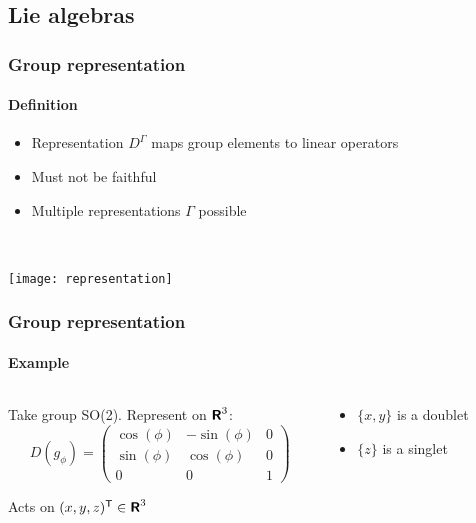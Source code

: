 \documentclass[english, fleqn]{beamer}
\begin{document}
\subsection{Lie algebras}

\begin{frame}
    \frametitle{Group representation}
    \framesubtitle{Definition}

    \begin{itemize}
        \item Representation $D^\Gamma$ maps group elements to linear operators
        \item Must not be faithful
        \item Multiple representations $\Gamma$ possible
    \end{itemize}

    \

    \begin{center}
        \texttt{[image: representation]}
    \end{center}
\end{frame}

\begin{frame}
    \frametitle{Group representation}
    \framesubtitle{Example}
    
    \begin{columns}
        \begin{column}{.6\linewidth}
            Take group SO(2). Represent on $\text{\bfseries\sffamily{R}}^3$:
            \[
                D(g_\phi) =
                \begin{pmatrix}
                    \cos(\phi) & - \sin(\phi) & 0 \\
                    \sin(\phi) & \cos(\phi) & 0 \\
                    0 & 0 & 1
                \end{pmatrix}
            \]

            Acts on $(x, y, z)^\mathsf T \in \text{\bfseries\sffamily{R}}^3$
        \end{column}
        \pause
        \begin{column}{.4\linewidth}
            \begin{itemize}
                \item $\{ x, y \}$ is a doublet
                \item $\{ z \}$ is a singlet
            \end{itemize}
        \end{column}
    \end{columns}
\end{frame}
\end{document}
